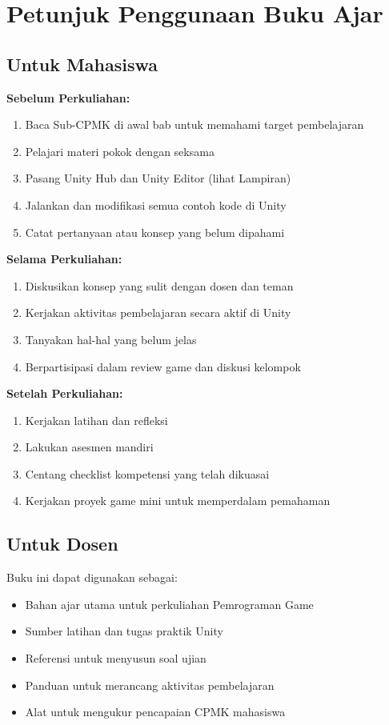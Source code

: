 \section{Petunjuk Penggunaan Buku Ajar}

\subsection{Untuk Mahasiswa}

\textbf{Sebelum Perkuliahan:}
\begin{enumerate}
  \item Baca Sub-CPMK di awal bab untuk memahami target pembelajaran
  \item Pelajari materi pokok dengan seksama
  \item Pasang Unity Hub dan Unity Editor (lihat Lampiran)
  \item Jalankan dan modifikasi semua contoh kode di Unity
  \item Catat pertanyaan atau konsep yang belum dipahami
\end{enumerate}

\textbf{Selama Perkuliahan:}
\begin{enumerate}
  \item Diskusikan konsep yang sulit dengan dosen dan teman
  \item Kerjakan aktivitas pembelajaran secara aktif di Unity
  \item Tanyakan hal-hal yang belum jelas
  \item Berpartisipasi dalam review game dan diskusi kelompok
\end{enumerate}

\textbf{Setelah Perkuliahan:}
\begin{enumerate}
  \item Kerjakan latihan dan refleksi
  \item Lakukan asesmen mandiri
  \item Centang checklist kompetensi yang telah dikuasai
  \item Kerjakan proyek game mini untuk memperdalam pemahaman
\end{enumerate}

\subsection{Untuk Dosen}

Buku ini dapat digunakan sebagai:
\begin{itemize}
  \item Bahan ajar utama untuk perkuliahan Pemrograman Game
  \item Sumber latihan dan tugas praktik Unity
  \item Referensi untuk menyusun soal ujian
  \item Panduan untuk merancang aktivitas pembelajaran
  \item Alat untuk mengukur pencapaian CPMK mahasiswa
\end{itemize}
